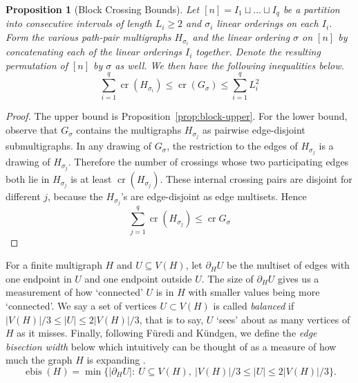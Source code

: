 \documentclass[11pt,a4paper]{amsart}
\newtheorem{proposition}[theorem]{Proposition}
\theoremstyle{definition}
\theoremstyle{remark}
\DeclareMathOperator{\crn}{cr}
\DeclareMathOperator{\bis}{ebis}
\begin{document}
\begin{proposition}[Block Crossing Bounds]\label{prop:block}
Let $[n] = I_{1} \sqcup \hdots \sqcup I_{q}$ be a partition into consecutive intervals of length $L_{i} \geq 2$ and $\sigma_{i}$ linear orderings on each $I_{i}$.  Form the various path-pair multigraphs $H_{\sigma_{i}}$ and the linear ordering $\sigma$ on $[n]$ by concatenating each of the linear orderings $I_{i}$ together.  Denote the resulting permutation of $[n]$ by $\sigma$ as well.  We then have the following inequalities below.
\begin{equation*}
\sum_{i=1}^{q} \crn(H_{\sigma_{i}}) \leq \crn(G_{\sigma}) \leq \sum_{i=1}^{q} L_{i}^{2}
\end{equation*}
\end{proposition}

\begin{proof}
The upper bound is Proposition~\ref{prop:block-upper}.  For the lower bound, observe that $G_{\sigma}$ contains the multigraphs $H_{\sigma_{j}}$ as pairwise edge-disjoint submultigraphs.  In any drawing of $G_{\sigma}$, the restriction to the edges of $H_{\sigma_{j}}$ is a drawing of $H_{\sigma_{j}}$.  Therefore the number of crossings whose two participating edges both lie in $H_{\sigma_{j}}$ is at least $\crn(H_{\sigma_{j}})$.  These internal crossing pairs are disjoint for different $j$, because the $H_{\sigma_{j}}$'s are edge-disjoint as edge multisets.  Hence
\begin{equation*}
        \sum_{j=1}^q \crn(H_{\sigma_{j}}) \leq \crn G_{\sigma}  
\end{equation*}
\end{proof}

For a finite multigraph $H$ and $U\subseteq V(H)$, let $\partial_H U$ be the multiset of edges with one endpoint in $U$ and one endpoint outside $U$.  The size of $\partial_H U$ gives us a measurement of how `connected' $U$ is in $H$ with smaller values being more `connected'.  We say a set of vertices $U \subset V(H)$ is called \emph{balanced} if $|V(H)|/3 \leq |U| \leq 2|V(H)|/3$, that is to say, $U$ `sees' about as many vertices of $H$ as it misses.  Finally, following F{\"u}redi and K{\"u}ndgen, we define the \emph{edge bisection width} below which intuitively can be thought of as a measure of how much the graph $H$ is expanding \cite{FurediKundgen2006}.  
\begin{equation}\label{eq:bis-wid}
        \bis(H)
        =
        \min\{|\partial_H U|:\ U\subseteq V(H),\ |V(H)|/3\le |U|\le 2|V(H)|/3\}.
\end{equation}
\end{document}
